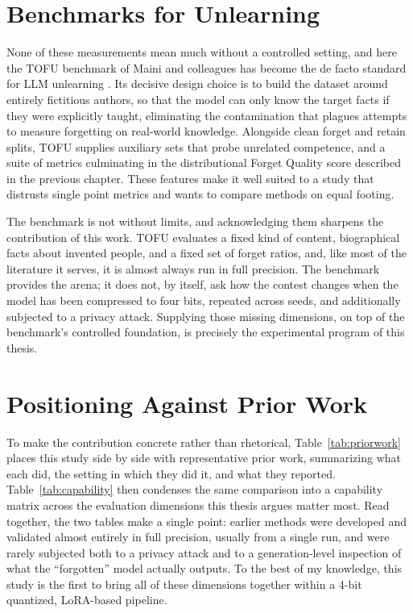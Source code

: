 \documentclass[a4paper,12pt]{report}
\begin{document}
\section{Benchmarks for Unlearning}
None of these measurements mean much without a controlled setting, and here the TOFU benchmark of Maini and colleagues has become the de facto standard for LLM unlearning \parencite{maini2024tofu}. Its decisive design choice is to build the dataset around entirely fictitious authors, so that the model can only know the target facts if they were explicitly taught, eliminating the contamination that plagues attempts to measure forgetting on real-world knowledge. Alongside clean forget and retain splits, TOFU supplies auxiliary sets that probe unrelated competence, and a suite of metrics culminating in the distributional Forget Quality score described in the previous chapter. These features make it well suited to a study that distrusts single point metrics and wants to compare methods on equal footing.

The benchmark is not without limits, and acknowledging them sharpens the contribution of this work. TOFU evaluates a fixed kind of content, biographical facts about invented people, and a fixed set of forget ratios, and, like most of the literature it serves, it is almost always run in full precision. The benchmark provides the arena; it does not, by itself, ask how the contest changes when the model has been compressed to four bits, repeated across seeds, and additionally subjected to a privacy attack. Supplying those missing dimensions, on top of the benchmark's controlled foundation, is precisely the experimental program of this thesis.

\section{Positioning Against Prior Work}
\label{sec:positioning}
To make the contribution concrete rather than rhetorical, Table~\ref{tab:priorwork} places this study side by side with representative prior work, summarizing what each did, the setting in which they did it, and what they reported. Table~\ref{tab:capability} then condenses the same comparison into a capability matrix across the evaluation dimensions this thesis argues matter most. Read together, the two tables make a single point: earlier methods were developed and validated almost entirely in full precision, usually from a single run, and were rarely subjected both to a privacy attack and to a generation-level inspection of what the ``forgotten'' model actually outputs. To the best of my knowledge, this study is the first to bring all of these dimensions together within a 4-bit quantized, LoRA-based pipeline.
\end{document}

